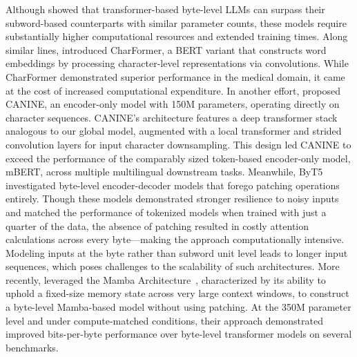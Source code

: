 Although \cite{Choe2019BridgingTG} showed that transformer-based byte-level LLMs can surpass their subword-based counterparts with similar parameter counts, these models require substantially higher computational resources and extended training times. Along similar lines, \cite{el2020characterbert} introduced CharFormer, a BERT variant that constructs word embeddings by processing character-level representations via convolutions. While CharFormer demonstrated superior performance in the medical domain, it came at the cost of increased computational expenditure. In another effort, \cite{clark2022canine} proposed CANINE, an encoder-only model with 150M parameters, operating directly on character sequences. CANINE's architecture features a deep transformer stack analogous to our global model, augmented with a local transformer and strided convolution layers for input character downsampling. This design led CANINE to exceed the performance of the comparably sized token-based encoder-only model, mBERT, across multiple multilingual downstream tasks. Meanwhile, ByT5~\citep{xue2022byt5} investigated byte-level encoder-decoder models that forego patching operations entirely. Though these models demonstrated stronger resilience to noisy inputs and matched the performance of tokenized models when trained with just a quarter of the data, the absence of patching resulted in costly attention calculations across every byte—making the approach computationally intensive. Modeling inputs at the byte rather than subword unit level leads to longer input sequences, which poses challenges to the scalability of such architectures. More recently, \cite{wang2024mambabyte} leveraged the Mamba Architecture~\citep{gu2023mamba}, characterized by its ability to uphold a fixed-size memory state across very large context windows, to construct a byte-level Mamba-based model without using patching. At the 350M parameter level and under compute-matched conditions, their approach demonstrated improved bits-per-byte performance over byte-level transformer models on several benchmarks.

